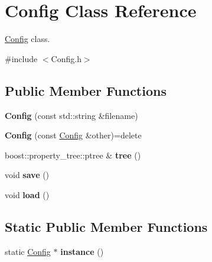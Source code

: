 \hypertarget{class_config}{\section{Config Class Reference}
\label{class_config}
}


\hyperlink{class_config}{Config} class.  




{\ttfamily \#include $<$Config.\-h$>$}

\subsection*{Public Member Functions}
\begin{DoxyCompactItemize}
\item 
\hypertarget{class_config_abc51a2c710c8666d27b53cc03597201d}{{\bfseries Config} (const std\-::string \&filename)}\label{class_config_abc51a2c710c8666d27b53cc03597201d}

\item 
\hypertarget{class_config_aea1b7e862074892ee39a5583c342c482}{{\bfseries Config} (const \hyperlink{class_config}{Config} \&other)=delete}\label{class_config_aea1b7e862074892ee39a5583c342c482}

\item 
\hypertarget{class_config_a006701bd126aa5809b3a15e75c63bfb6}{boost\-::property\-\_\-tree\-::ptree \& {\bfseries tree} ()}\label{class_config_a006701bd126aa5809b3a15e75c63bfb6}

\item 
\hypertarget{class_config_ae7e68962f22a2c965a61702de1c637db}{void {\bfseries save} ()}\label{class_config_ae7e68962f22a2c965a61702de1c637db}

\item 
\hypertarget{class_config_add4ebd0c89505c9b5368f03264555606}{void {\bfseries load} ()}\label{class_config_add4ebd0c89505c9b5368f03264555606}

\end{DoxyCompactItemize}
\subsection*{Static Public Member Functions}
\begin{DoxyCompactItemize}
\item 
\hypertarget{class_config_abf1d4539011ef83cac0fef2ac864a3a9}{static \hyperlink{class_config}{Config} $\ast$ {\bfseries instance} ()}\label{class_config_abf1d4539011ef83cac0fef2ac864a3a9}

\end{DoxyCompactItemize}



